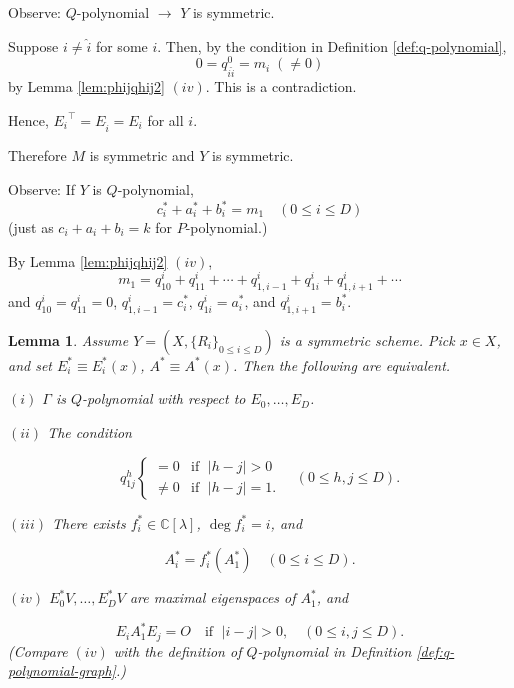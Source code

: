\documentclass[
]{book}
\newtheorem{lemma}{Lemma}[chapter]
\theoremstyle{definition}
\theoremstyle{definition}
\theoremstyle{definition}
\theoremstyle{definition}
\theoremstyle{remark}
\begin{document}
Observe: \(Q\)-polynomial \(\to\) \(Y\) is symmetric.

Suppose \(i\neq \hat{i}\) for some \(i\). Then, by the condition in Definition \ref{def:q-polynomial},
\[0 = q^0_{i\hat{i}} = m_i \; (\neq 0)\]
by Lemma \ref{lem:phijqhij2} \((iv)\).
This is a contradiction.

Hence, \({E_i}^\top = E_{\hat{i}} = E_i\) for all \(i\).

Therefore \(M\) is symmetric and \(Y\) is symmetric.

Observe: If \(Y\) is \(Q\)-polynomial,
\[c^*_i + a^*_i + b^*_i = m_1 \quad (0\leq i\leq D)\]
(just as \(c_i + a_i + b_i = k\) for \(P\)-polynomial.)

By Lemma \ref{lem:phijqhij2} \((iv)\),
\[m_1 = q^i_{10} + q^i_{11} + \cdots + q^i_{1,i-1} + q^i_{1i} + q^i_{1,i+1} + \cdots \]
and \(q^i_{10} = q^i_{11} = 0\), \(q^i_{1,i-1} = c^*_i\), \(q^i_{1i} = a^*_i\), and \(q^i_{1,i+1} = b^*_i\).

\begin{lemma}
\protect\hypertarget{lem:q-conditions}{}\label{lem:q-conditions}Assume \(Y = (X, \{R_i\}_{0\leq i\leq D})\) is a symmetric scheme. Pick \(x\in X\), and set \(E^*_i\equiv E^*_i(x)\), \(A^*\equiv A^*(x)\). Then the following are equivalent.

\((i)\) \(\Gamma\) is \(Q\)-polynomial with respect to \(E_0, \ldots, E_D\).

\((ii)\) The condition

\[q^h_{1j} \begin{cases} = 0 & \text{if $\; |h-j| > 0$} \\
\neq 0 & \text{if $\; |h-j| = 1$}. \end{cases} \quad (0\leq h,j\leq D).\]

\((iii)\) There exists \(f_i^*\in \mathbb{C}[\lambda]\), \(\deg f^*_i = i\), and

\[A^*_i = f^*_i(A^*_1) \quad (0\leq i\leq D).\]

\((iv)\) \(E^*_0V, \ldots, E^*_DV\) are maximal eigenspaces of \(A^*_1\), and

\[E_iA^*_1E_j = O \quad \text{if }\; |i-j|>0, \quad (0\leq i,j\leq D).\]
(Compare \((iv)\) with the definition of \(Q\)-polynomial in Definition \ref{def:q-polynomial-graph}.)
\end{lemma}
\end{document}
